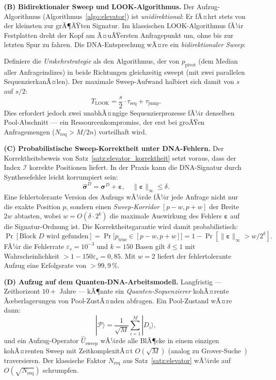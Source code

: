 ﻿\documentclass[a4paper,12pt]{article}
\theoremstyle{definition}
\theoremstyle{plain}
\begin{document}
\textbf{(B) Bidirektionaler Sweep und LOOK-Algorithmus.}
Der Aufzug-Algorithmus (Algorithmus~\ref{algo:elevator}) ist
\emph{unidirektional}: Er fÃ¤hrt stets von der kleinsten zur grÃ¶ÃŸten
Signatur.  Im klassischen LOOK-Algorithmus fÃ¼r Festplatten dreht der
Kopf am Ã¤uÃŸersten Anfragepunkt um, ohne bis zur letzten Spur zu fahren.
Die DNA-Entsprechung wÃ¤re ein \emph{bidirektionaler Sweep}:

Definiere die \emph{Umkehrstrategie} als den Algorithmus, der von
$p_{\mathrm{pivot}}$ (dem Median aller Anfrageindizes) in beide
Richtungen gleichzeitig sweept (mit zwei parallelen SequenzierkanÃ¤len).
Der maximale Sweep-Aufwand halbiert sich damit von $s$ auf $s/2$:
\[
  T_{\mathrm{LOOK}} = \frac{s}{2} \cdot \tau_{\mathrm{seq}} + \tau_{\mathrm{jump}}.
\]
Dies erfordert jedoch zwei unabhÃ¤ngige Sequenzierprozesse fÃ¼r denselben
Pool-Abschnitt --- ein Ressourcenkompromiss, der erst bei groÃŸen
Anfragemengen ($N_{\mathrm{req}} > M/2n$) vorteilhaft wird.

\textbf{(C) Probabilistische Sweep-Korrektheit unter DNA-Fehlern.}
Der Korrektheitsbeweis von Satz~\ref{satz:elevator_korrektheit} setzt
voraus, dass der Index $\mathcal{I}$ korrekte Positionen liefert.
In der Praxis kann die DNA-Signatur durch Synthesefehler leicht
korrumpiert sein:
\[
  \hat{\boldsymbol{\sigma}}^D = \boldsymbol{\sigma}^D + \boldsymbol{\varepsilon},
  \quad \|\boldsymbol{\varepsilon}\|_\infty \le \delta.
\]
Eine fehlertolerante Version des Aufzugs wÃ¼rde fÃ¼r jede Anfrage nicht
nur die exakte Position $p$, sondern einen \emph{Sweep-Korridor}
$[p - w, p + w]$ der Breite $2w$ abtasten, wobei
$w = O(\delta \cdot 2^k)$ die maximale Aus\-wirkung des Fehlers
$\boldsymbol{\varepsilon}$ auf die Signatur-Ordnung ist.
Die Korrektheitsgaran\-tie wird damit probabilistisch:
\[
  \Pr[\text{Block } D \text{ wird gefunden}]
  = \Pr\bigl[p_{\mathrm{true}} \in [p - w, p + w]\bigr]
  = 1 - \Pr[\|\boldsymbol{\varepsilon}\|_\infty > w / 2^k].
\]
FÃ¼r die Fehlerrate $\varepsilon_s = 10^{-3}$ und $k = 150$ Basen gilt
$\delta \le 1$ mit Wahrscheinlichkeit $> 1 - 150 \varepsilon_s = 0{,}85$.
Mit $w = 2$ liefert der fehlertolerante Aufzug eine Erfolgsrate von
$> 99{,}9\,\%$.

\textbf{(D) Aufzug auf dem Quanten-DNA-Arbeitsmodell.}
Langfristig --- Zeithorizont $10{+}$ Jahre --- kÃ¶nnte ein
\emph{Quanten-Sequenzierer} kohÃ¤rente Ãœberlagerungen von Pool-ZustÃ¤nden
abfragen.  Ein Pool-Zustand wÃ¤re dann:
\[
  |\mathcal{P}\rangle = \frac{1}{\sqrt{M}} \sum_{i=1}^{M} |D_i\rangle,
\]
und ein Aufzug-Operator $\hat{U}_{\mathrm{sweep}}$ wÃ¼rde alle BlÃ¶cke
in einem einzigen kohÃ¤renten Sweep mit ZeitkomplexitÃ¤t $O(\sqrt{M})$
(analog zu Grover-Suche~\cite{grover1996}) traversieren.  Der
klassische Faktor $N_{\mathrm{req}}$ aus Satz~\ref{satz:elevator}
wÃ¼rde auf $O(\sqrt{N_{\mathrm{req}}})$ schrumpfen.
\end{document}
